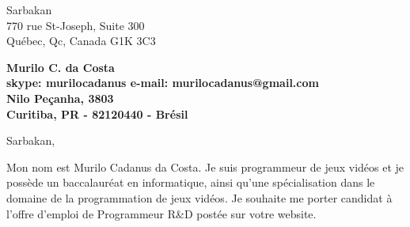 \documentclass[11pt]{letter} %
\begin{document}

\begin{letter}{%
Sarbakan \\
770 rue St-Joseph, Suite 300 \\
Québec, Qc, Canada G1K 3C3} 


\begin{center}
\large\bf Murilo C. da Costa \\ %
skype: murilocadanus e-mail: murilocadanus@gmail.com \\
Nilo Peçanha, 3803 \\ Curitiba, PR - 82120440 - Brésil
\end{center} 
\vfill

\signature{Murilo C. da Costa} %


\opening{Sarbakan,} 


Mon nom est Murilo Cadanus da Costa. Je suis programmeur de jeux vidéos et je possède un baccalauréat en informatique, ainsi qu'une spécialisation dans le domaine de la programmation de jeux vidéos. Je souhaite me porter candidat à l'offre d'emploi de Programmeur R\&D postée sur votre website.


\end{letter}
\end{document}
